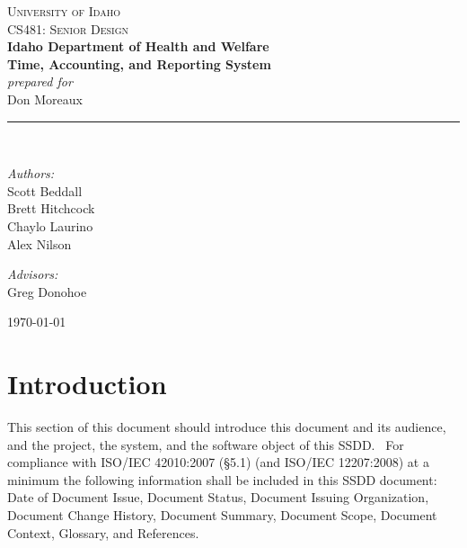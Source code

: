 \documentclass[letterpaper]{article}
\newcommand{\HRule}{\rule{5cm}{0.1mm}}
\begin{document}
\begin{center}



\textsc{\Large University of Idaho}\\[0.2cm]

\textsc{\Large CS481: Senior Design}\\[2cm]


{ \LARGE \bfseries Idaho Department of Health and Welfare}\\[0.4cm]
{ \huge \bfseries Time, Accounting, and Reporting System}\\[1.0cm]
{ \normalsize \emph{ prepared for}}\\[0.5cm]
{ \normalsize Don Moreaux}\\[0.5cm]
\HRule \\[3cm]

\begin{minipage}{0.4\textwidth}
\begin{flushleft} \large
\emph{Authors:}\\
Scott Beddall\\
Brett Hitchcock\\
Chaylo Laurino\\
Alex Nilson
\end{flushleft}
\end{minipage}
\begin{minipage}{0.4\textwidth}
\begin{flushright} \large
\emph{Advisors:} \\
Greg Donohoe\\
\bigskip
\bigskip
\bigskip
\bigskip
\end{flushright}
\end{minipage}

{\large \today}

\end{center}
\pagebreak


\pagebreak
\section{\bfseries{Introduction}}
This section of this document should introduce this document and its
audience, and the project, the system, and the software object of this
SSDD. \ For compliance with ISO/IEC 42010:2007 (§5.1) (and ISO/IEC
12207:2008) at a minimum the following information shall be included in
this SSDD document: Date of Document Issue, Document Status, Document
Issuing Organization, Document Change History, Document Summary,
Document Scope, Document Context, Glossary, and References.
\end{document}
